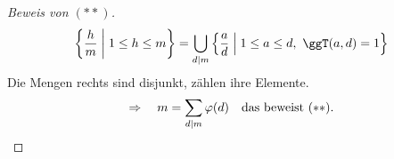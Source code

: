 \begin{proof}[Beweis von $(**)$]
\[ \left\{ \frac{h}{m} \;\middle|\; 1 \leq h \leq m \right\} = \bigcup_{d \mid m} \left\{ \frac{a}{d} \;\middle|\; 1 \leq a \leq d,\ \ggT(a, d) = 1 \right\} \]
Die Mengen rechts sind disjunkt, zählen ihre Elemente.
\[ \Rightarrow \quad m = \sum_{d \mid m} \varphi(d) \quad \text{das beweist } (**). \qedhere \]
\end{proof}
